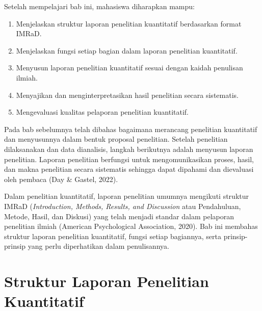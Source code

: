 \documentclass[
  indonesian,
  letterpaper,
  DIV=11,
  numbers=noendperiod]{scrreprt}
\providecommand{\tightlist}{%
  \setlength{\itemsep}{0pt}\setlength{\parskip}{0pt}}
\begin{document}
\begin{tcolorbox}[enhanced jigsaw, colframe=quarto-callout-note-color-frame, toptitle=1mm, breakable, leftrule=.75mm, arc=.35mm, toprule=.15mm, colback=white, colbacktitle=quarto-callout-note-color!10!white, bottomtitle=1mm, bottomrule=.15mm, titlerule=0mm, title=\textcolor{quarto-callout-note-color}{\faInfo}\hspace{0.5em}{Capaian Pembelajaran}, coltitle=black, left=2mm, opacitybacktitle=0.6, opacityback=0, rightrule=.15mm]

Setelah mempelajari bab ini, mahasiswa diharapkan mampu:

\begin{enumerate}
\def\labelenumi{\arabic{enumi}.}
\tightlist
\item
  Menjelaskan struktur laporan penelitian kuantitatif berdasarkan format
  IMRaD.
\item
  Menjelaskan fungsi setiap bagian dalam laporan penelitian kuantitatif.
\item
  Menyusun laporan penelitian kuantitatif sesuai dengan kaidah penulisan
  ilmiah.
\item
  Menyajikan dan menginterpretasikan hasil penelitian secara sistematis.
\item
  Mengevaluasi kualitas pelaporan penelitian kuantitatif.
\end{enumerate}

\end{tcolorbox}

Pada bab sebelumnya telah dibahas bagaimana merancang penelitian
kuantitatif dan menyusunnya dalam bentuk proposal penelitian. Setelah
penelitian dilaksanakan dan data dianalisis, langkah berikutnya adalah
menyusun laporan penelitian. Laporan penelitian berfungsi untuk
mengomunikasikan proses, hasil, dan makna penelitian secara sistematis
sehingga dapat dipahami dan dievaluasi oleh pembaca (Day \& Gastel,
2022).

Dalam penelitian kuantitatif, laporan penelitian umumnya mengikuti
struktur IMRaD (\emph{Introduction, Methods, Results, and Discussion}
atau Pendahuluan, Metode, Hasil, dan Diskusi) yang telah menjadi standar
dalam pelaporan penelitian ilmiah (American Psychological Association,
2020). Bab ini membahas struktur laporan penelitian kuantitatif, fungsi
setiap bagiannya, serta prinsip-prinsip yang perlu diperhatikan dalam
penulisannya.

\section{Struktur Laporan Penelitian
Kuantitatif}\label{struktur-laporan-penelitian-kuantitatif}
\end{document}
